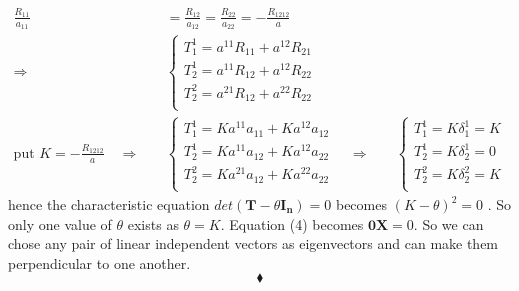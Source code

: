 \begin{align*}
\frac{R_{11}}{a_{11}} &= \frac{R_{12}}{a_{12}}=\frac{R_{22}}{a_{22}}=-\frac{R_{1212}}{a}\\
\Rightarrow\quad & \left \{ \begin{array}{l}
 T^{1}_{1} = a^{11}R_{11} +  a^{12}R_{21}\\
 T^{1}_{2} = a^{11}R_{12} +  a^{12}R_{22}\\
 T^{2}_{2} = a^{21}R_{12} +  a^{22}R_{22}\\
\end{array} \right.\\
\text{put } K=-\frac{R_{1212}}{a} \quad \Rightarrow\quad & \left \{ \begin{array}{l}
 T^{1}_{1} = K a^{11}a_{11} +  K a^{12}a_{12}\\
 T^{1}_{2} = Ka^{11}a_{12} +  Ka^{12}a_{22}\\
 T^{2}_{2} = Ka^{21}a_{12} +  Ka^{22}a_{22}\\
\end{array} \right.\quad
\Rightarrow\quad & \left \{ \begin{array}{l}
 T^{1}_{1} = K\delta^1_1 = K \\
 T^{1}_{2} = K\delta^1_2 = 0\\
 T^{2}_{2} = K\delta^2_2 = K\\
\end{array} \right.
\end{align*}
hence the characteristic equation $det\left(\mathbf{T}-\theta \mathbf{I_n} \right)=0$ becomes $ (K-\theta)^2=0$ . So only one value of $\theta$ exists as $\theta = K$.  Equation (4) becomes $\mathbf{0}\mathbf{X}=0$. So we can chose any pair of linear independent vectors as eigenvectors and can make them perpendicular to one another.
$$\blacklozenge$$
\newpage

